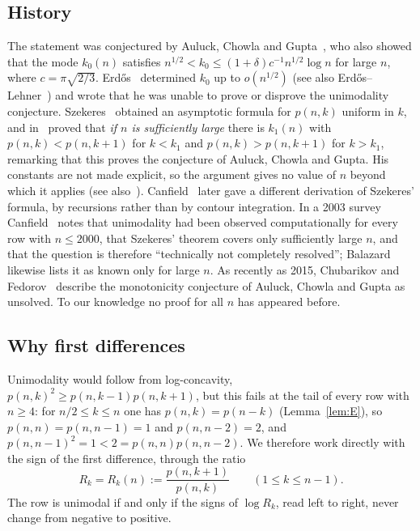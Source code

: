 \documentclass[11pt]{amsart}
\theoremstyle{definition}
\theoremstyle{remark}
\numberwithin{equation}{section}
\begin{document}
\subsection*{History}
The statement was conjectured by Auluck, Chowla and Gupta~\cite{ACG42}, who also showed that the mode $k_0(n)$ satisfies
$n^{1/2}<k_0\le(1+\delta)c^{-1}n^{1/2}\log n$ for large $n$, where $c=\pi\sqrt{2/3}$. Erd\H{o}s~\cite{Erdos46} determined $k_0$ up to $o(n^{1/2})$
(see also Erd\H{o}s--Lehner~\cite{EL41}) and wrote that he was unable to prove or disprove the unimodality conjecture.
Szekeres~\cite{Sz51,Sz53} obtained an asymptotic formula for $p(n,k)$ uniform in $k$, and in~\cite[Theorem~2]{Sz53} proved that
\emph{if $n$ is sufficiently large} there is $k_1(n)$ with $p(n,k)<p(n,k+1)$ for $k<k_1$ and $p(n,k)>p(n,k+1)$ for $k>k_1$, remarking
that this proves the conjecture of Auluck, Chowla and Gupta. His constants are not made explicit, so the argument gives no value of
$n$ beyond which it applies (see also~\cite{Sz90}). Canfield~\cite{Can97} later gave a different derivation of Szekeres' formula, by
recursions rather than by contour integration. In a 2003 survey Canfield~\cite{Can03} notes that unimodality had been observed
computationally for every row with $n\le2000$, that Szekeres' theorem covers only sufficiently large $n$, and that the question is
therefore ``technically not completely resolved''; Balazard~\cite{Bal90} likewise lists it as known only for large $n$. As recently as 2015, Chubarikov and Fedorov~\cite{CF15} describe the monotonicity
conjecture of Auluck, Chowla and Gupta as unsolved. To our knowledge no proof for all $n$ has appeared before.

\subsection*{Why first differences}
Unimodality would follow from log-concavity, $p(n,k)^2\ge p(n,k-1)p(n,k+1)$, but this fails at the tail of every row with
$n\ge4$: for $n/2\le k\le n$ one has $p(n,k)=p(n-k)$ (Lemma~\ref{lem:E}), so $p(n,n)=p(n,n-1)=1$ and $p(n,n-2)=2$, and
$p(n,n-1)^2=1<2=p(n,n)p(n,n-2)$. We therefore work directly with the sign of the first difference, through the ratio
\[
  R_k=R_k(n):=\frac{p(n,k+1)}{p(n,k)}\qquad(1\le k\le n-1).
\]
The row is unimodal if and only if the signs of $\log R_k$, read left to right, never change from negative to positive.
\end{document}
